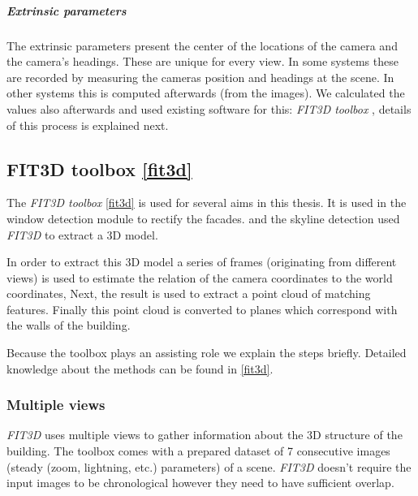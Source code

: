 \subparagraph{Extrinsic parameters}
The extrinsic parameters present the center of the locations of the camera
and the camera's headings. These are unique for every view.
In some systems these are recorded by measuring the cameras position and
headings at the scene. In other systems this is computed afterwards (from the
images).  We calculated the values also afterwards and used existing software for
this: \emph{FIT3D toolbox} \cite{Fit3d}, details of this process is
explained next.


\subsection{FIT3D toolbox \ref{fit3d}}
\label{sec:prelimFIT3D}
The \emph{FIT3D toolbox} \ref{fit3d} is used for several aims in this thesis.
It is used in the window detection module to rectify the facades.
and the skyline detection used \emph{FIT3D} to extract a 3D model.

In order to extract this 3D model a series of frames (originating from different
views) is used to estimate the relation of the camera coordinates to the
world coordinates, Next, the result is used to extract a point cloud of matching
features. Finally this point cloud is converted to planes which correspond with the walls of the building.

Because the toolbox plays an assisting role we explain the steps briefly.
Detailed knowledge about the methods can be found in \ref{fit3d}.

\subsubsection{Multiple views}
\emph{FIT3D} uses multiple views to gather information about the 3D structure of the
building. The toolbox comes with a prepared dataset of 7 consecutive images (steady (zoom, lightning,
etc.) parameters) of a scene.  \emph{FIT3D} doesn't require the input images to be
chronological however they need to have sufficient overlap. 


